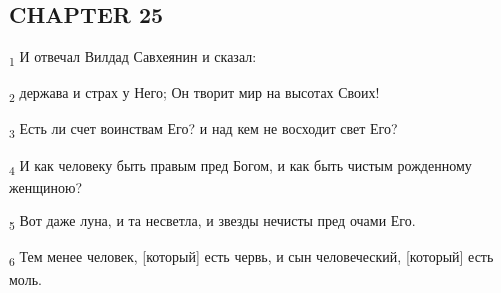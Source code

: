 \subsection{CHAPTER 25}
\begin{tcolorbox}
\textsubscript{1} И отвечал Вилдад Савхеянин и сказал:
\end{tcolorbox}
\begin{tcolorbox}
\textsubscript{2} держава и страх у Него; Он творит мир на высотах Своих!
\end{tcolorbox}
\begin{tcolorbox}
\textsubscript{3} Есть ли счет воинствам Его? и над кем не восходит свет Его?
\end{tcolorbox}
\begin{tcolorbox}
\textsubscript{4} И как человеку быть правым пред Богом, и как быть чистым рожденному женщиною?
\end{tcolorbox}
\begin{tcolorbox}
\textsubscript{5} Вот даже луна, и та несветла, и звезды нечисты пред очами Его.
\end{tcolorbox}
\begin{tcolorbox}
\textsubscript{6} Тем менее человек, [который] есть червь, и сын человеческий, [который] есть моль.
\end{tcolorbox}
